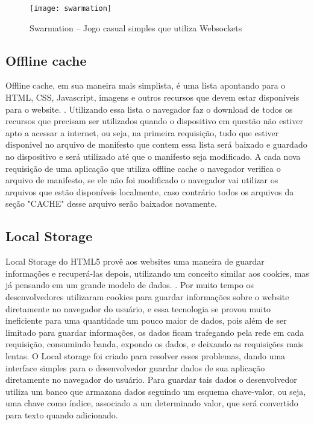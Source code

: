 \begin{figure}[H]
  \centering
	\texttt{[image: swarmation]}
  \caption{Swarmation {--} Jogo casual simples que utiliza Websockets}
  \label{img:swarmation}
\end{figure}

\clearpage


\subsection{Offline cache}

Offline cache, em sua maneira mais simplista, é uma lista apontando
para o HTML, CSS, Javascript, imagens e outros recursos que devem
estar disponíveis para o website. \cite{pilgrim2010html5}. Utilizando
essa lista o navegador faz o download de todos os recursos que
precisam ser utilizados quando o dispositivo em questão não estiver
apto a acessar a internet, ou seja, na primeira requisição, tudo que estiver
disponivel no arquivo de manifesto que contem essa lista será baixado
e guardado no dispositivo e será utilizado até que o manifesto seja
modificado.
A cada nova requisição de uma aplicação que utiliza offline cache o
navegador verifica o arquivo de manifesto, se ele não foi modificado
o navegador vai utilizar os arquivos que estão disponíveis localmente,
caso contrário todos os arquivos da seção "CACHE" desse arquivo serão baixados novamente.


\subsection{Local Storage}

Local Storage do HTML5 provê aos websites uma maneira de guardar
informações e recuperá-las depois, utilizando um conceito similar aos
cookies, mas já pensando em um grande modelo de dados. \cite{pilgrim2010html5}.
Por muito tempo os desenvolvedores utilizaram cookies para guardar
informações sobre o website diretamente no navegador do usuário, e
essa tecnologia se provou muito ineficiente para uma quantidade um
pouco maior de dados, pois além de ser limitado para guardar informações,
os dados ficam trafegando pela rede em cada requisição, consumindo
banda, expondo os dados, e deixando as requisições mais lentas.
O Local storage foi criado para resolver esses problemas, dando uma
interface simples para o desenvolvedor guardar dados de sua
aplicação diretamente no navegador do usuário. Para guardar tais dados
o desenvolvedor utiliza um banco que armazana dados seguindo um
esquema chave-valor, ou seja, uma chave como índice, associado a um
determinado valor, que será convertido para texto quando adicionado.

